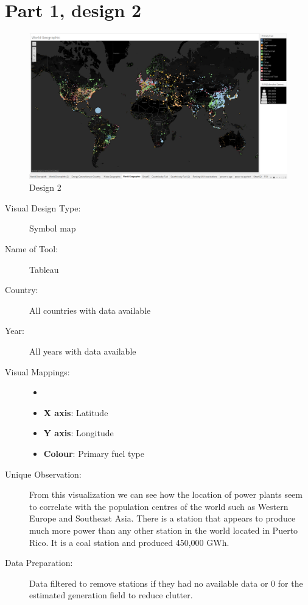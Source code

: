 \documentclass{article}
\begin{document}
\section*{Part 1, design 2}

\begin{figure}[ht]
\centering
\includegraphics[scale=0.35]{Design-2.PNG}
\caption{Design 2}
\end{figure}

\begin{description}
\item[Visual Design Type:]
Symbol map
\item[Name of Tool:]
Tableau
\item[Country:]
All countries with data available
\item[Year:]
All years with data available
\item[Visual Mappings:]
\begin{itemize}
    \item[]
    \item \textbf{X axis}: Latitude
    \item \textbf{Y axis}: Longitude
    \item \textbf{Colour}: Primary fuel type
\end{itemize} 
\item[Unique Observation:]
From this visualization we can see how the location of power plants seem to correlate with the population centres of the world such as Western Europe and Southeast Asia.
There is a station that appears to produce much more power than any other station in the world located in Puerto Rico.
It is a coal station and produced 450,000 GWh.
\item[Data Preparation:]
Data filtered to remove stations if they had no available data or 0 for the  estimated generation field to reduce clutter.
\end{description}
\end{document}
